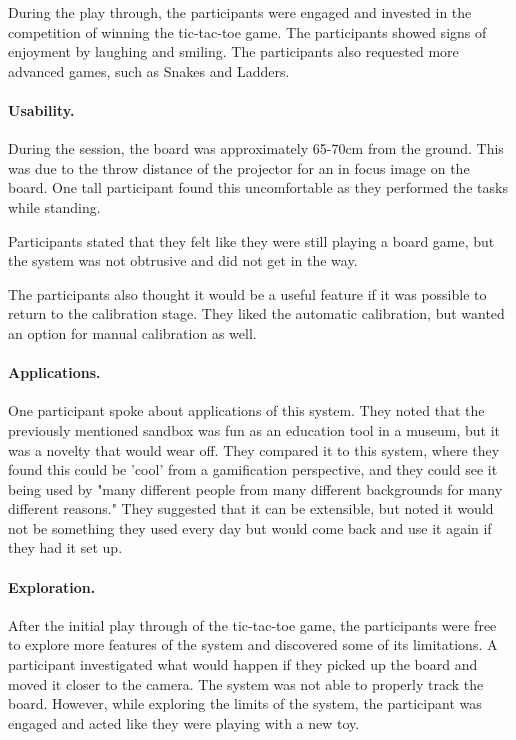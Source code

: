 \documentclass[12pt]{article}
\begin{document}
During the play through, the participants were engaged and invested in the competition of winning the tic-tac-toe game. The participants showed signs of enjoyment by laughing and smiling. The participants also requested more advanced games, such as Snakes and Ladders.

\paragraph{Usability.} During the session, the board was approximately 65-70cm from the ground. This was due to the throw distance of the projector for an in focus image on the board.
One tall participant found this uncomfortable as they performed the tasks while standing. 

Participants stated that they felt like they were still playing a board game, but the system was not obtrusive and did not get in the way. 

The participants also thought it would be a useful feature if it was possible to return to the calibration stage. They liked the automatic calibration, but wanted an option for manual calibration as well. 

\paragraph{Applications.} One participant spoke about applications of this system. They noted that the previously mentioned sandbox was fun as an education tool in a museum, but it was a novelty that would wear off. They compared it to this system, where they found this could be 'cool' from a gamification  perspective, and they could see it being used by "many different people from many different backgrounds for many different reasons." They suggested that it can be extensible, but noted it would not be something they used every day but would come back and use it again if they had it set up. 

\paragraph{Exploration.} After the initial play through of the tic-tac-toe game, the participants were free to explore more features of the system and discovered some of its limitations. A participant investigated what would happen if they picked up the board and moved it closer to the camera. The system was not able to properly track the board. However, while exploring the limits of the system, the participant was engaged and acted like they were playing with a new toy. 
\end{document}
